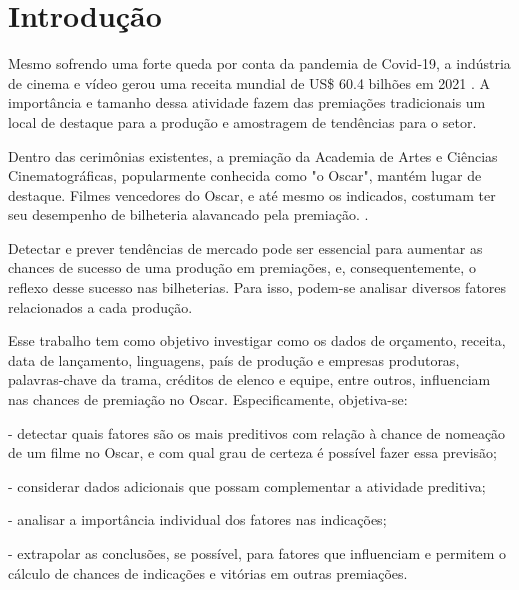 
\chapter[Introdução]{Introdução}
Mesmo sofrendo uma forte queda por conta da pandemia de Covid-19, a indústria de cinema e vídeo gerou uma receita mundial de US\$ 60.4 bilhões em 2021 \cite{indiantelevision2021}. A importância e tamanho dessa atividade fazem das premiações tradicionais um local de destaque para a produção e amostragem de tendências para o setor.\par
Dentro das cerimônias existentes, a premiação da Academia de Artes e Ciências Cinematográficas, popularmente conhecida como "o Oscar", mantém lugar de destaque. Filmes vencedores do Oscar, e até mesmo os indicados, costumam ter seu desempenho de bilheteria alavancado pela premiação. \cite{hdsr2020}.

Detectar e prever tendências de mercado pode ser essencial para aumentar as chances de sucesso de uma produção em premiações, e, consequentemente, o reflexo desse sucesso nas bilheterias. Para isso, podem-se analisar diversos fatores relacionados a cada produção.\par

Esse trabalho tem como objetivo investigar como os dados de orçamento, receita, data de lançamento, linguagens, país de produção e empresas produtoras, palavras-chave da trama, créditos de elenco e equipe, entre outros, influenciam nas chances de premiação no Oscar. Especificamente, objetiva-se:\par

- detectar quais fatores são os mais preditivos com relação à chance de nomeação de um filme no Oscar, e com qual grau de certeza é possível fazer essa previsão;\par
- considerar dados adicionais que possam complementar a atividade preditiva;\par
- analisar a importância individual dos fatores nas indicações;\par
- extrapolar as conclusões, se possível, para fatores que influenciam e permitem o cálculo de chances de indicações e vitórias em outras premiações.\par
\par

